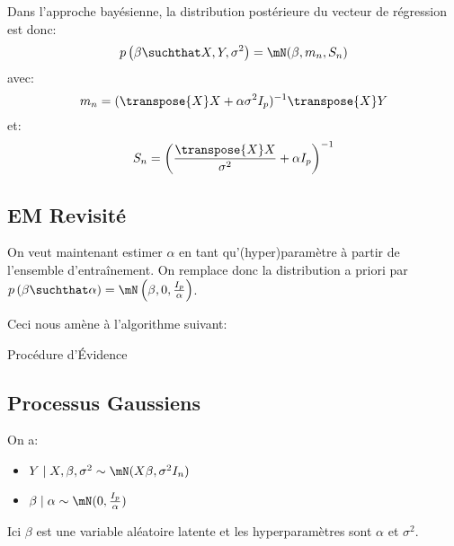 \documentclass[info, math, french]{mpb-cours}
\def\model#1#2{p\left(#1\suchthat#2\right)}
\begin{document}
\begin{proposition}
	Dans l'approche bayésienne, la distribution postérieure du vecteur de régression est donc:
	\begin{equation*}
		\model{\beta}{X, Y, \sigma^{2}} = \mN(\beta, m_{n}, S_{n})
	\end{equation*}
	avec:
	\begin{equation*}
		m_{n} = (\transpose{X}X + \alpha\sigma^{2}I_{p})^{-1}\transpose{X}Y
	\end{equation*}
	et:
	\begin{equation*}
		S_{n} = \left(\frac{\transpose{X}X}{\sigma^{2}} + \alpha I_{p}\right)^{-1}
	\end{equation*}
\end{proposition}

\subsection{EM Revisité}
On veut maintenant estimer $\alpha$ en tant qu'(hyper)paramètre à partir de l'ensemble d'entraînement.
On remplace donc la distribution a priori par $\model{\beta}{\alpha} = \mN\left(\beta, 0, \frac{I_{p}}{\alpha}\right)$.

Ceci nous amène à l'algorithme suivant:
\begin{algorithm}
	\caption{Procédure d'Évidence}
	\begin{algorithmic}
		\EndProcedure
		\Statex
		\EndProcedure
		\Statex
		\Statex
		\EndWhile
		\EndProcedure{}
	\end{algorithmic}
\end{algorithm}

\subsection{Processus Gaussiens}
On a:
\begin{itemize}
	\item $Y \mid X, \beta, \sigma^{2} \sim \mN(X\beta, \sigma^{2}I_{n})$
	\item $\beta \mid \alpha \sim \mN(0, \frac{I_{p}}{\alpha})$
\end{itemize}
Ici $\beta$ est une variable aléatoire latente et les hyperparamètres sont $\alpha$ et $\sigma^{2}$.
\end{document}
